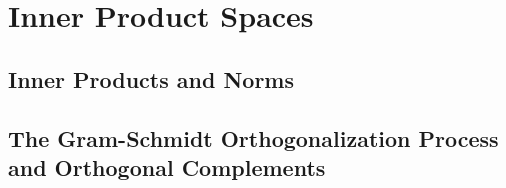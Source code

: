 \setcounter{chapter}{5}
\chapter{Inner Product Spaces}

\section{Inner Products and Norms}



\vspace{12pt}

\setcounter{Exercise}{3}


\vspace{12pt}

\setcounter{Exercise}{7}


\vspace{12pt}



\vspace{12pt}

\setcounter{Exercise}{10}


\vspace{12pt}




\section{The Gram-Schmidt Orthogonalization Process and Orthogonal Complements}



\vspace{12pt}



\vspace{12pt}

\setcounter{Exercise}{5}


\vspace{12pt}

\setcounter{Exercise}{12}


\vspace{12pt}

\setcounter{Exercise}{18}



